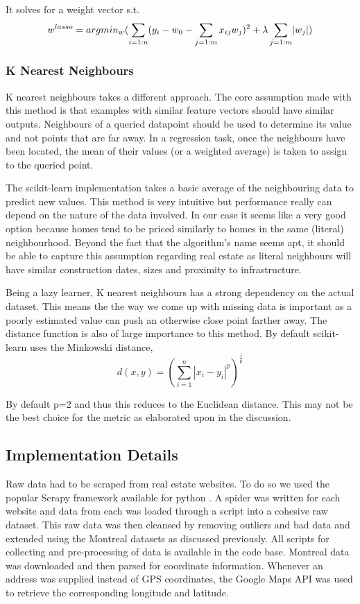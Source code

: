 \documentclass{acm_proc_article-sp}
\DeclarePairedDelimiter{\abs}{\lvert}{\rvert}
\begin{document}
	It solves for a weight vector s.t. \\
	\[ w^{lasso} = argmin_{w}(\sum_{i=1:n}(y_{i} - w_{0} - \sum_{j=1:m}x_{ij}w_{j})^{2} + \lambda\sum_{j=1:m}\abs{w_{j}}) \]
	
	
\subsubsection{K Nearest Neighbours} %
	K nearest neighbours takes a different approach. The core assumption made with this method is that examples with similar feature vectors should have similar outputs. Neighbours of a queried datapoint should be used to determine its value and not points that are far away. In a regression task, once the neighbours have been located, the mean of their values (or a weighted average) is taken to assign to the queried point.
	
	The scikit-learn implementation takes a basic average of the neighbouring data to predict new values. This method is very intuitive but performance really can depend on the nature of the data involved. In our case it seems like a very good option because homes tend to be priced similarly to homes in the same (literal) neighbourhood. Beyond the fact that the algorithm's name seems apt, it should be able to capture this assumption regarding real estate as literal neighbours will have similar construction dates, sizes and proximity to infrastructure.
	
	Being a lazy learner, K nearest neighbours has a strong dependency on the actual dataset. This means the the way we come up with missing data is important as a poorly estimated value can push an otherwise close point farther away. The distance function is also of large importance to this method. By default scikit-learn uses the Minkowski distance,
	\[ d(x, y) = (\sum_{i=1}^n | x_i - y_i|^p)^{\frac{1}{p}} \]
	
	 By default p=2 and thus this reduces to the Euclidean distance. This may not be the best choice for the metric as elaborated upon in the discussion.

\subsection{Implementation Details} %

	Raw data had to be scraped from real estate websites. To do so we used the popular Scrapy framework available for python \cite{scrapy}. A spider was written for each website and data from each was loaded through a script into a cohesive raw dataset. This raw data was then cleansed by removing outliers and bad data and extended using the Montreal datasets as discussed previously. All scripts for collecting and pre-processing of data is available in the code base. Montreal data was downloaded and then parsed for coordinate information. Whenever an address was supplied instead of GPS coordinates, the Google Maps API was used to retrieve the corresponding longitude and latitude.
	
\end{document}
